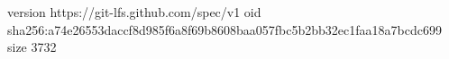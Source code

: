 version https://git-lfs.github.com/spec/v1
oid sha256:a74e26553daccf8d985f6a8f69b8608baa057fbc5b2bb32ec1faa18a7bcdc699
size 3732
